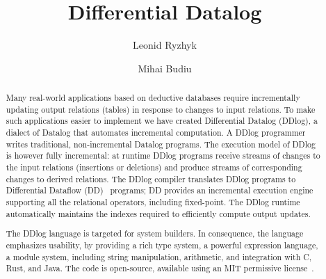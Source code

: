 \documentclass{svproc}
\author{
        Leonid Ryzhyk \and
        Mihai Budiu}
\institute{VMware Research}
\title{Differential Datalog}
\date{}
\begin{document}
\maketitle

\begin{abstract}

Many real-world applications based on deductive databases require
incrementally updating output relations (tables) in response to
changes to input relations.  To make such applications easier to
implement we have created Differential Datalog (DDlog), a dialect of
Datalog that automates incremental computation.  A DDlog programmer
writes traditional, non-incremental Datalog programs.  The execution
model of DDlog is however fully incremental: at runtime DDlog programs
receive streams of changes to the input relations (insertions or
deletions) and produce streams of corresponding changes to derived
relations.  The DDlog compiler translates DDlog programs to
Differential Dataflow (DD)~\cite{differential-dataflow-paper}
programs; DD provides an incremental execution engine supporting all
the relational operators, including fixed-point.  The DDlog runtime
automatically maintains the indexes required to efficiently compute
output updates.

The DDlog language is targeted for system builders.  In consequence,
the language emphasizes usability, by providing a rich type system, a
powerful expression language, a module system, including string
manipulation, arithmetic, and integration with C, Rust, and Java.  The
code is open-source, available using an MIT permissive license~\cite{ddlog}.
\end{abstract}










\end{document}
